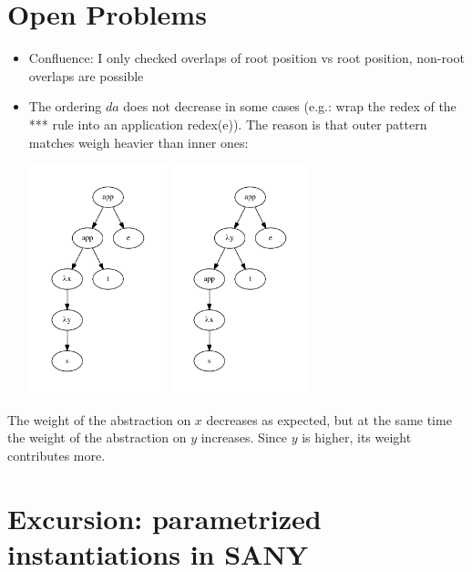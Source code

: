 \documentclass[a4paper]{article}
\begin{document}
\section{Open Problems}
\begin{itemize}
\item Confluence: I only checked overlaps of root position vs root position,
  non-root overlaps are possible
\item The ordering $da$ does not decrease in some cases (e.g.: wrap the redex of
  the *** rule into an application redex(e)). The reason is that outer pattern
  matches weigh heavier than inner ones:
  \begin{center}
    \includegraphics[width=4cm]{measure_ce1.pdf}
    \includegraphics[width=4cm]{measure_ce2.pdf}
  \end{center}
\end{itemize}

The weight of the abstraction on $x$ decreases as expected, but at the same time
the weight of the abstraction on $y$ increases. Since $y$ is higher, its weight
contributes more.

\section{Excursion: parametrized instantiations in SANY}
\label{sec:param-inst}
\end{document}
